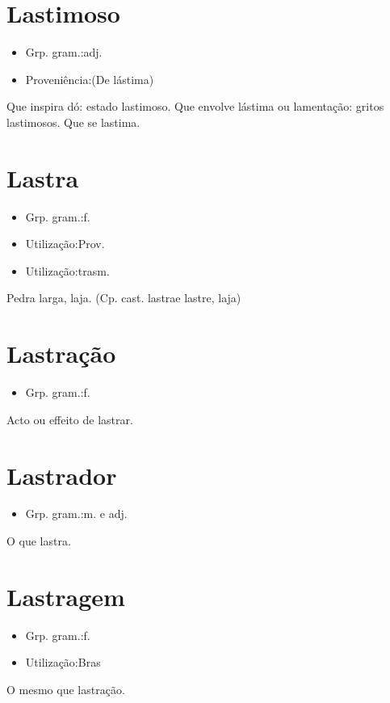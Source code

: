 \section{Lastimoso}
\begin{itemize}
\item {Grp. gram.:adj.}
\end{itemize}
\begin{itemize}
\item {Proveniência:(De \textunderscore lástima\textunderscore )}
\end{itemize}
Que inspira dó: \textunderscore estado lastimoso\textunderscore .
Que envolve lástima ou lamentação: \textunderscore gritos lastimosos\textunderscore .
Que se lastima.
\section{Lastra}
\begin{itemize}
\item {Grp. gram.:f.}
\end{itemize}
\begin{itemize}
\item {Utilização:Prov.}
\end{itemize}
\begin{itemize}
\item {Utilização:trasm.}
\end{itemize}
Pedra larga, laja.
(Cp. cast. \textunderscore lastra\textunderscore  e \textunderscore lastre\textunderscore , laja)
\section{Lastração}
\begin{itemize}
\item {Grp. gram.:f.}
\end{itemize}
Acto ou effeito de lastrar.
\section{Lastrador}
\begin{itemize}
\item {Grp. gram.:m.  e  adj.}
\end{itemize}
O que lastra.
\section{Lastragem}
\begin{itemize}
\item {Grp. gram.:f.}
\end{itemize}
\begin{itemize}
\item {Utilização:Bras}
\end{itemize}
O mesmo que \textunderscore lastração\textunderscore .
